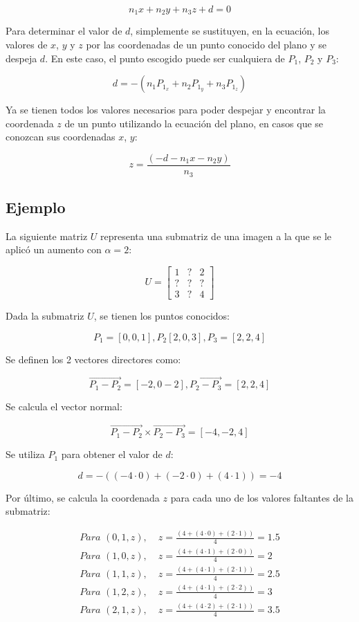 \documentclass[12pt,a4paper]{article}
\begin{document}
\[
n_1x + n_2y + n_3z + d = 0
\]

Para determinar el valor de $d$, simplemente se sustituyen, en la ecuación, los valores de $x$, $y$ y $z$ por las coordenadas de un punto conocido del plano y se despeja $d$. En este caso, el punto escogido puede ser cualquiera de $P_1$, $P_2$ y $P_3$:

\[
d = -(n_1P_{1_x} + n_2P_{1_y} + n_3P_{1_z})
\]

Ya se tienen todos los valores necesarios para poder despejar y encontrar la coordenada $z$ de un punto utilizando la ecuación del plano, en casos que se conozcan sus coordenadas $x$, $y$: 

\[
z = \frac{(-d - n_1x - n_2y)}{n_3}
\]

\subsection{Ejemplo}

La siguiente matriz $U$ representa una submatriz de una imagen a la que se le aplicó un aumento con $\alpha = 2$:

\[
U =
    \begin{bmatrix}
    1 & ? & 2 \\
    ? & ? & ? \\
    3 & ? & 4
    \end{bmatrix}
\]

Dada la submatriz $U$, se tienen los puntos conocidos:

\[
P_1 = [0,0,1], P_2 [2,0,3], P_3 = [2,2,4]
\]

Se definen los 2 vectores directores como:

\[
\vec{P_1 - P_2} = [-2,0-2], \vec{P_2 - P_3} = [2,2,4]
\]

Se calcula el vector normal:

\[
\vec{P_1 - P_2} \times \vec{P_2 - P_3} = [-4,-2,4]
\]

Se utiliza $P_1$ para obtener el valor de $d$:

\[
d = -((-4 \cdot 0) + (-2\cdot 0) + (4\cdot 1)) = -4
\]

Por último, se calcula la coordenada $z$ para cada uno de los valores faltantes de la submatriz:

\begin{align*}
\textit{Para } (0,1,z), \; & z = \frac{(4 + (4 \cdot 0) + (2 \cdot 1))}{4} = 1.5 \\[6pt]
\textit{Para } (1,0,z), \; & z = \frac{(4 + (4 \cdot 1) + (2 \cdot 0))}{4} = 2 \\[6pt]
\textit{Para } (1,1,z), \; & z = \frac{(4 + (4 \cdot 1) + (2 \cdot 1))}{4} = 2.5 \\[6pt]
\textit{Para } (1,2,z), \; & z = \frac{(4 + (4 \cdot 1) + (2 \cdot 2))}{4} = 3 \\[6pt]
\textit{Para } (2,1,z), \; & z = \frac{(4 + (4 \cdot 2) + (2 \cdot 1))}{4} = 3.5
\end{align*}
\end{document}
